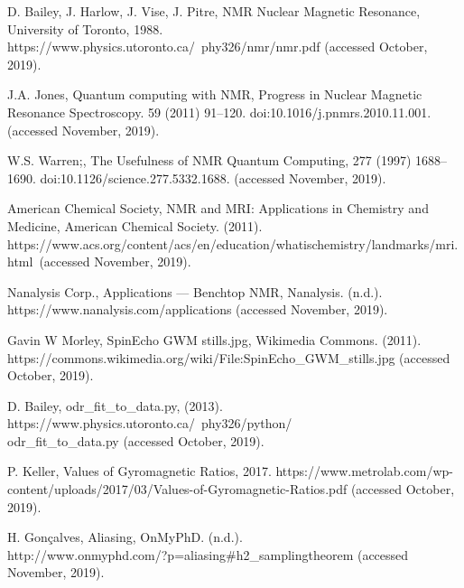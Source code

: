 \documentclass[a4paper, 12pt]{article}  %
\begin{document}
\begin{thebibliography}{9}

D. Bailey, J. Harlow, J. Vise, J. Pitre, NMR Nuclear Magnetic Resonance, University of Toronto, 1988. https://www.physics.utoronto.ca/~phy326/nmr/nmr.pdf (accessed October, 2019).

J.A. Jones, Quantum computing with NMR, Progress in Nuclear Magnetic Resonance Spectroscopy. 59 (2011) 91–120. doi:10.1016/j.pnmrs.2010.11.001.(accessed November, 2019).

W.S. Warren;, The Usefulness of NMR Quantum Computing, 277 (1997) 1688–1690. doi:10.1126/science.277.5332.1688. (accessed November, 2019).

American Chemical Society, NMR and MRI: Applications in Chemistry and Medicine, American Chemical Society. (2011). https://www.acs.org/content/acs/en/education/whatischemistry/landmarks/mri.html\ (accessed November, 2019).

Nanalysis Corp., Applications — Benchtop NMR, Nanalysis. (n.d.). https://www.nanalysis.com/applications (accessed November, 2019).

Gavin W Morley, SpinEcho GWM stills.jpg,     Wikimedia Commons. (2011). https://commons.wikimedia.org/wiki/File:SpinEcho\_GWM\_stills.jpg (accessed October, 2019).

D. Bailey, odr\_fit\_to\_data.py, (2013). https://www.physics.utoronto.ca/~phy326/python/\\odr\_fit\_to\_data.py (accessed October, 2019).

P. Keller, Values of Gyromagnetic Ratios, 2017. https://www.metrolab.com/wp-content/uploads/2017/03/Values-of-Gyromagnetic-Ratios.pdf (accessed October, 2019).

H. Gonçalves, Aliasing, OnMyPhD. (n.d.). \\ http://www.onmyphd.com/?p=aliasing\#h2\_samplingtheorem (accessed November, 2019).

\end{thebibliography}

\end{document}
